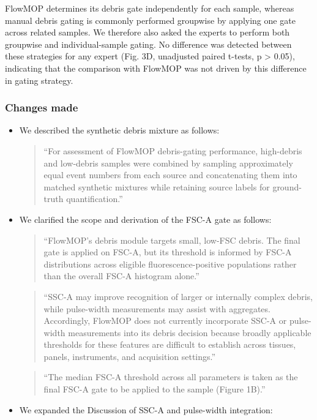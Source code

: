 \documentclass[
  11pt,
  a4paper,
]{article}
\begin{document}
{\color{revisionblue}FlowMOP determines its debris gate independently
for each sample, whereas manual debris gating is commonly performed
groupwise by applying one gate across related samples. We therefore also
asked the experts to perform both groupwise and individual-sample
gating. No difference was detected between these strategies for any
expert (Fig. 3D, unadjusted paired t-tests, p \textgreater{} 0.05),
indicating that the comparison with FlowMOP was not driven by this
difference in gating strategy.}

\subsubsection{Changes made}\label{changes-made-9}

\begin{itemize}
\item
  We described the synthetic debris mixture as follows:

  \begin{quote}
  ``For assessment of FlowMOP debris-gating performance, high-debris and
  low-debris samples were combined by sampling approximately equal event
  numbers from each source and concatenating them into matched synthetic
  mixtures while retaining source labels for ground-truth
  quantification.''
  \end{quote}
\item
  We clarified the scope and derivation of the FSC-A gate as follows:

  \begin{quote}
  ``FlowMOP's debris module targets small, low-FSC debris. The final
  gate is applied on FSC-A, but its threshold is informed by FSC-A
  distributions across eligible fluorescence-positive populations rather
  than the overall FSC-A histogram alone.''
  \end{quote}

  \begin{quote}
  ``SSC-A may improve recognition of larger or internally complex
  debris, while pulse-width measurements may assist with aggregates.
  Accordingly, FlowMOP does not currently incorporate SSC-A or
  pulse-width measurements into its debris decision because broadly
  applicable thresholds for these features are difficult to establish
  across tissues, panels, instruments, and acquisition settings.''
  \end{quote}

  \begin{quote}
  ``The median FSC-A threshold across all parameters is taken as the
  final FSC-A gate to be applied to the sample (Figure 1B).''
  \end{quote}
\item
  We expanded the Discussion of SSC-A and pulse-width integration:


\end{itemize}
\end{document}

